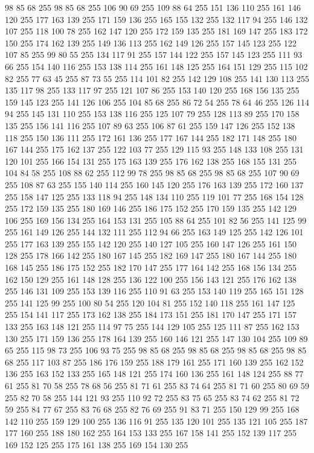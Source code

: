 98 85 68 255 98 85 68 255 106 90 69 255 109 88 64 255 151 136 110 255 161 146 120 255 177 163 139 255 171 159 136 255 165 155 132 255 132 117 94 255 146 132 107 255 118 100 78 255 162 147 120 255 172 159 135 255 181 169 147 255 183 172 150 255 174 162 139 255 149 136 113 255 162 149 126 255 157 145 123 255 122 107 85 255 99 80 55 255 134 117 91 255 157 144 122 255 157 145 123 255 111 93 66 255 154 140 116 255 153 138 114 255 161 148 125 255 164 151 129 255 115 102 82 255 77 63 45 255 87 73 55 255 114 101 82 255 142 129 108 255 141 130 113 255 135 117 98 255 133 117 97 255 121 107 86 255 153 140 120 255 168 156 135 255 159 145 123 255 141 126 106 255 104 85 68 255 86 72 54 255 78 64 46 255 126 114 94 255 145 131 110 255 153 138 116 255 125 107 79 255 128 113 89 255 170 158 135 255 156 141 116 255 107 89 63 255 106 87 61 255 159 147 126 255 152 138 118 255 150 136 111 255 172 161 136 255 177 167 144 255 182 171 148 255 180 167 144 255 175 162 137 255 122 103 77 255
129 115 93 255 148 133 108 255 131 120 101 255 166 154 131 255 175 163 139 255 176 162 138 255 168 155 131 255 104 84 58 255 108 88 62 255 112 99 78 255 98 85 68 255 98 85 68 255 107 90 69 255 108 87 63 255 155 140 114 255 160 145 120 255 176 163 139 255 172 160 137 255 158 147 125 255 133 118 94 255 148 134 110 255 119 101 77 255 168 154 128 255 172 159 135 255 180 169 146 255 186 175 152 255 170 159 135 255 142 129 106 255 169 156 134 255 164 153 131 255 105 88 64 255 101 82 56 255 141 125 99 255 161 149 126 255 144 132 111 255 112 94 66 255 163 149 125 255 142 126 101 255 177 163 139 255 155 142 120 255 140 127 105 255 160 147 126 255 161 150 128 255 178 166 142 255 180 167 145 255 182 169 147 255 180 167 144 255 180 168 145 255 186 175 152 255 182 170 147 255 177 164 142 255 168 156 134 255 162 150 129 255 161 148 128 255 136 122 100 255 156 143 121 255 176 162 138 255 146 131 109 255 153 139 116 255 110 91 63 255 153 140 119 255 165 151 128 255 141 125 99 255 100 80 54 255
120 104 81 255 152 140 118 255 161 147 125 255 154 141 117 255 173 162 138 255 184 173 151 255 181 170 147 255 171 157 133 255 163 148 121 255 114 97 75 255 144 129 105 255 125 111 87 255 162 153 130 255 171 159 136 255 178 164 139 255 160 146 121 255 147 130 104 255 109 89 65 255 115 98 73 255 106 93 75 255 98 85 68 255 98 85 68 255 98 85 68 255 98 85 68 255 117 103 87 255 186 176 159 255 188 179 161 255 171 160 139 255 162 152 136 255 163 152 133 255 165 148 121 255 174 160 136 255 161 148 124 255 88 77 61 255 81 70 58 255 78 68 56 255 81 71 61 255 83 74 64 255 81 71 60 255 80 69 59 255 82 70 58 255 144 121 93 255 110 92 72 255 83 75 65 255 83 74 62 255 81 72 59 255 84 77 67 255 83 76 68 255 82 76 69 255 91 83 71 255 150 129 99 255 168 142 110 255 159 129 100 255 136 116 91 255 135 120 101 255 135 121 105 255 187 177 160 255 188 180 162 255 164 153 133 255 167 158 141 255 152 139 117 255 169 152 125 255 175 161 138 255 169 154 130 255
